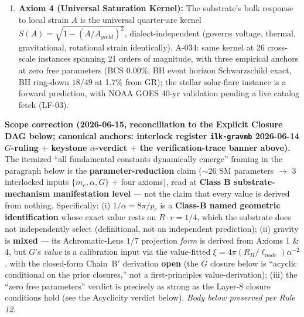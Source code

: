 \begin{enumerate}
    \item \textbf{Axiom 4 (Universal Saturation Kernel):} The substrate's bulk response to local strain $A$ is the universal quarter-arc kernel $S(A) = \sqrt{1 - (A/A_{yield})^2}$, dialect-independent (governs voltage, thermal, gravitational, rotational strain identically). A-034: same kernel at 26 cross-scale instances spanning 21 orders of magnitude, with three empirical anchors at zero free parameters (BCS 0.00\%, BH event horizon Schwarzschild exact, BH ring-down $18/49$ at 1.7\% from GR); the stellar solar-flare instance is a forward prediction, with NOAA GOES 40-yr validation pending a live catalog fetch (LF-03). %
\end{enumerate}

\textbf{Scope correction (2026-06-15, reconciliation to the Explicit Closure DAG below; canonical anchors: interlock register \texttt{ilk-gravmb} 2026-06-14 $G$-ruling $+$ keystone $\alpha$-verdict $+$ the verification-trace banner above).} The itemized ``all fundamental constants dynamically emerge'' framing in the paragraph below is the \textbf{parameter-reduction} claim ($\sim$26 SM parameters $\to$ 3 interlocked inputs $\{m_e, \alpha, G\}$ $+$ four axioms), read at \textbf{Class B substrate-mechanism manifestation level} --- not the claim that every value is derived from nothing. Specifically: (i) $1/\alpha = 8\pi/p_c$ is a \textbf{Class-B named geometric identification} whose exact value rests on $R \cdot r = 1/4$, which the substrate does not independently select (definitional, not an independent prediction); (ii) gravity is \textbf{mixed} --- its Achromatic-Lens $1/7$ projection \emph{form} is derived from Axioms 1 \& 4, but $G$'s \emph{value} is a calibration input via the value-fitted $\xi = 4\pi(R_H/\ell_{node})\alpha^{-2}$, with the closed-form Chain~B$'$ derivation \textbf{open} (the $G$ closure below is ``acyclic conditional on the prior closures,'' not a first-principles value-derivation); (iii) the ``zero free parameters'' verdict is precisely as strong as the Layer-8 closure conditions hold (see the Acyclicity verdict below). \textit{Body below preserved per Rule 12.}

